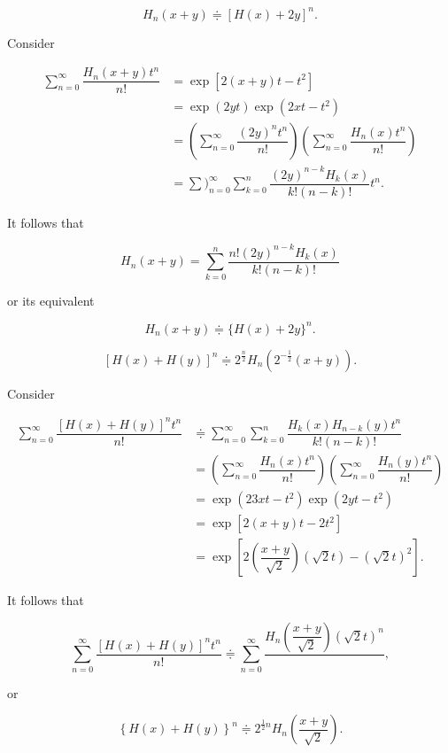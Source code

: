 \begin{problem}\label{problem1chapter15}
$$H_n(x+y) \doteqdot [H(x)+2y]^n.$$
\end{problem}
\begin{solution}
Consider

$$\begin{array}{ll}
\displaystyle\sum_{n=0}^{\infty} \dfrac{H_n(x+y)t^n}{n!} &= \exp[2(x+y)t-t^2] \\
&= \exp(2yt) \exp(2xt-t^2) \\
&= \left( \displaystyle\sum_{n=0}^{\infty} \dfrac{(2y)^nt^n}{n!} \right) \left( \displaystyle\sum_{n=0}^{\infty} \dfrac{H_n(x)t^n}{n!} \right) \\
&= \displaystyle\sum)_{n=0}^{\infty} \displaystyle\sum_{k=0}^n \dfrac{(2y)^{n-k}H_k(x)}{k!(n-k)!} t^n.
\end{array}$$

It follows that

$$H_n(x+y) = \displaystyle\sum_{k=0}^n \dfrac{n! (2y)^{n-k} H_k(x)}{k! (n-k)!}$$

or its equivalent

$$H_n(x+y) \doteqdot \{ H(x) + 2y\}^n.$$

\end{solution}
\begin{problem}\label{problem2chapter15}
$$[H(x)+H(y)]^n \doteqdot 2^{\frac{n}{2}}H_n(2^{-\frac{1}{2}}(x+y)).$$
\end{problem}
\begin{solution}
Consider

$$\begin{array}{ll}
\displaystyle\sum_{n=0}^{\infty} \dfrac{[H(x)+H(y)]^n t^n}{n!} &\doteqdot \displaystyle\sum_{n=0}^{\infty} \displaystyle\sum_{k=0}^n \dfrac{H_k(x)H_{n-k}(y)t^n}{k! (n-k)!} \\
&= \left( \displaystyle\sum_{n=0}^{\infty} \dfrac{H_n(x) t^n}{n!} \right) \left( \displaystyle\sum_{n=0}^{\infty} \dfrac{H_n(y)t^n}{n!} \right) \\
&= \exp(23xt-t^2) \exp(2yt-t^2) \\
&= \exp[2(x+y)t - 2t^2] \\
&= \exp \left[ 2 \left( \dfrac{x+y}{\sqrt{2}} \right)(\sqrt{2}t) - (\sqrt{2}t)^2 \right].
\end{array}$$

It follows that

$$\displaystyle\sum_{n=0}^{\infty} \dfrac{[H(x)+H(y)]^n t^n}{n!} \doteqdot \displaystyle\sum_{n=0}^{\infty} \dfrac{H_n \left( \dfrac{x+y}{\sqrt{2}} \right) (\sqrt{2}t)^n}{},$$

or

$$\left\{H(x) + H(y) \right\}^n \doteqdot 2^{\frac{1}{2}n} H_n \left( \dfrac{x+y}{\sqrt{2}} \right).$$
\end{solution}
